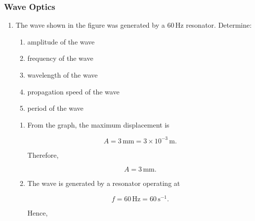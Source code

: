 \documentclass[t,aspectratio=169]{beamer}
\begin{document}
\begin{frame}
\frametitle{Wave Optics}

\begin{enumerate}

\item The wave shown in the figure was generated by a $60\,\mathrm{Hz}$ resonator. Determine:
\begin{enumerate}
\item[a)] amplitude of the wave
\item[b)] frequency of the wave
\item[c)] wavelength of the wave
\item[d)] propagation speed of the wave
\item[e)] period of the wave
\end{enumerate}

\begin{center}
\end{center}


\begin{enumerate}

\item[(a)] From the graph, the maximum displacement is

$$A=3\,\mathrm{mm}=3\times10^{-3}\,\mathrm{m}.$$

Therefore,

$$\boxed{A=3\,\mathrm{mm}}.$$

\item[(b)] The wave is generated by a resonator operating at

$$f=60\,\mathrm{Hz}=60\,\mathrm{s^{-1}}.$$

Hence,


\end{enumerate}
\end{enumerate}
\end{frame}
\end{document}
